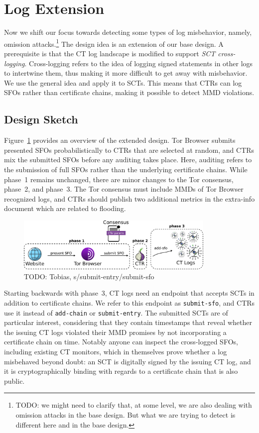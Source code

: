 \section{Log Extension} \label{sec:log}
Now we shift our focus towards detecting some types of log misbehavior, namely,
omission attacks.\footnote{%
	TODO: we might need to clarify that, at some level, we are also dealing with
	omission attacks in the base design.  But what we are trying to detect is
	different here and in the base design.
} The design idea is an
extension of our base design.  A prerequisite is that the CT log landscape
is modified to support \emph{SCT cross-logging}.  Cross-logging refers to the
idea of logging signed statements in other logs to intertwine
them, thus making it more difficult to get away with
misbehavior.  We use the general idea and apply it to SCTs.  This means that
CTRs can log SFOs rather than certificate chains, making it possible to detect
MMD violations.

\subsection{Design Sketch}
Figure~\ref{fig:ext-log} provides an overview of the extended design.  Tor
Browser submits presented SFOs probabilistically to CTRs that are selected
at random, and CTRs mix the submitted SFOs before any auditing takes place.
Here, auditing refers to the submission of full SFOs rather than the underlying
certificate chains.  While phase~1 remains unchanged, there are minor changes
to the Tor consensus, phase~2, and phase~3.  The Tor consensus must include MMDs
of Tor Browser recognized logs, and CTRs should publish two additional metrics
in the extra-info document which are related to flooding.

\begin{figure}
    \centering
    \includegraphics[width=0.85\textwidth]{img/design-log}
	\caption{TODO: Tobias, s/submit-entry/submit-sfo}
    \label{fig:ext-log}
\end{figure}

Starting backwards with phase~3, CT logs need an endpoint that accepts SCTs in
addition to certificate chains.  We refer to this endpoint as
\texttt{submit-sfo}, and CTRs use it instead of \texttt{add-chain} or
\texttt{submit-entry}.  The submitted SCTs are of particular interest,
considering that they contain timestamps that reveal whether the issuing CT logs
violated their MMD promises by not incorporating a certificate chain on time.
Notably anyone can inspect the cross-logged SFOs, including existing CT
monitors, which in themselves prove whether a log misbehaved beyond doubt:
	an SCT is digitally signed by the issuing CT log, and
	it is cryptographically binding with regards to a certificate chain that
		is also public.

